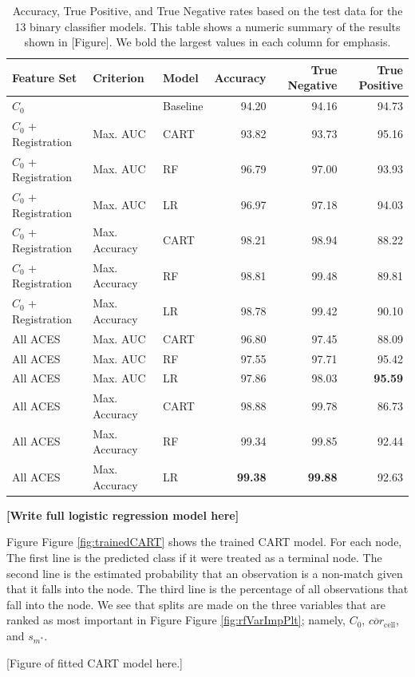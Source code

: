 \documentclass[11pt,]{isuthesis}
\begin{document}
\begin{table}

\caption{\label{tab:testDataResults}Accuracy, True Positive, and True Negative rates based on the test data for the 13 binary classifier models. This table shows a numeric summary of the results shown in [Figure]. We bold the largest values in each column for emphasis.}
\centering
\begin{tabular}[t]{lllrrr}
\toprule
Feature Set & Criterion & Model & Accuracy & True Negative & True Positive\\
\midrule
$C_0$ &  & Baseline & 94.20 & 94.16 & 94.73\\
\addlinespace
$C_0$ + Registration & Max. AUC & CART & 93.82 & 93.73 & 95.16\\
$C_0$ + Registration & Max. AUC & RF & 96.79 & 97.00 & 93.93\\
$C_0$ + Registration & Max. AUC & LR & 96.97 & 97.18 & 94.03\\
\addlinespace
$C_0$ + Registration & Max. Accuracy & CART & 98.21 & 98.94 & 88.22\\
$C_0$ + Registration & Max. Accuracy & RF & 98.81 & 99.48 & 89.81\\
$C_0$ + Registration & Max. Accuracy & LR & 98.78 & 99.42 & 90.10\\
\addlinespace
All ACES & Max. AUC & CART & 96.80 & 97.45 & 88.09\\
All ACES & Max. AUC & RF & 97.55 & 97.71 & 95.42\\
All ACES & Max. AUC & LR & 97.86 & 98.03 & \textbf{95.59}\\
\addlinespace
All ACES & Max. Accuracy & CART & 98.88 & 99.78 & 86.73\\
All ACES & Max. Accuracy & RF & 99.34 & 99.85 & 92.44\\
All ACES & Max. Accuracy & LR & \textbf{99.38} & \textbf{99.88} & 92.63\\
\bottomrule
\end{tabular}
\end{table}

\textbf{{[}Write full logistic regression model here{]}}

Figure Figure \ref{fig:trainedCART} shows the trained CART model.
For each node, The first line is the predicted class if it were treated as a terminal node.
The second line is the estimated probability that an observation is a non-match given that it falls into the node.
The third line is the percentage of all observations that fall into the node.
We see that splits are made on the three variables that are ranked as most important in Figure Figure \ref{fig:rfVarImpPlt}; namely, \(C_0\), \(\overline{cor}_{\text{cell}}\), and \(s_{m^*}\).

{[}Figure of fitted CART model here.{]}

\renewcommand\bibname{\centerline{REFERENCES}}
\unappendixtitle
\newpage
{}
{}

\end{document}
